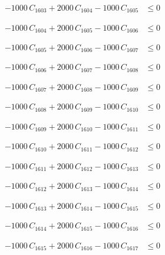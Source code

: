 \documentclass[a4paper,11pt]{article}
\begin{document}
\begin{align}
-1000\,C_{1603} + 2000\,C_{1604} - 1000\,C_{1605} &\leq 0 \nonumber
\end{align}

\begin{align}
-1000\,C_{1604} + 2000\,C_{1605} - 1000\,C_{1606} &\leq 0 \nonumber
\end{align}

\begin{align}
-1000\,C_{1605} + 2000\,C_{1606} - 1000\,C_{1607} &\leq 0 \nonumber
\end{align}

\begin{align}
-1000\,C_{1606} + 2000\,C_{1607} - 1000\,C_{1608} &\leq 0 \nonumber
\end{align}

\begin{align}
-1000\,C_{1607} + 2000\,C_{1608} - 1000\,C_{1609} &\leq 0 \nonumber
\end{align}

\begin{align}
-1000\,C_{1608} + 2000\,C_{1609} - 1000\,C_{1610} &\leq 0 \nonumber
\end{align}

\begin{align}
-1000\,C_{1609} + 2000\,C_{1610} - 1000\,C_{1611} &\leq 0 \nonumber
\end{align}

\begin{align}
-1000\,C_{1610} + 2000\,C_{1611} - 1000\,C_{1612} &\leq 0 \nonumber
\end{align}

\begin{align}
-1000\,C_{1611} + 2000\,C_{1612} - 1000\,C_{1613} &\leq 0 \nonumber
\end{align}

\begin{align}
-1000\,C_{1612} + 2000\,C_{1613} - 1000\,C_{1614} &\leq 0 \nonumber
\end{align}

\begin{align}
-1000\,C_{1613} + 2000\,C_{1614} - 1000\,C_{1615} &\leq 0 \nonumber
\end{align}

\begin{align}
-1000\,C_{1614} + 2000\,C_{1615} - 1000\,C_{1616} &\leq 0 \nonumber
\end{align}

\begin{align}
-1000\,C_{1615} + 2000\,C_{1616} - 1000\,C_{1617} &\leq 0 \nonumber
\end{align}
\end{document}
